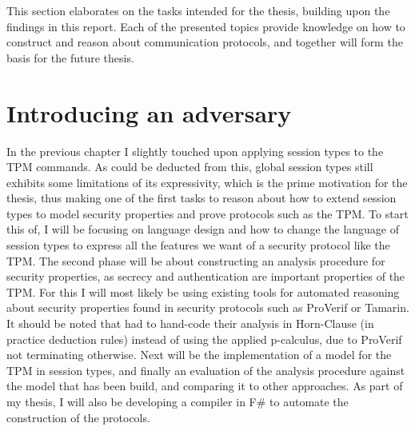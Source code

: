 \label{chap:Future Plan}
This section elaborates on the tasks intended for the thesis, building upon the findings in this report. Each of the presented topics provide knowledge on how to construct and reason about communication protocols, and together will form the basis for the future thesis. 

\section{Introducing an adversary}
In the previous chapter I slightly touched upon applying session types to the TPM commands. As could be deducted from this, global session types still exhibits some limitations of its expressivity, which is the prime motivation for the thesis, thus making one of the first tasks to reason about how to extend session types to model security properties and prove protocols such as the TPM. 
To start this of, I will be focusing on language design and how to change the language of session types to express all the features we want of a security protocol like the TPM. 
The second phase will be about constructing an analysis procedure for security properties, as secrecy and authentication are important properties of the TPM. For this I will most likely be using existing tools for automated reasoning about security properties found in security protocols such as ProVerif or Tamarin. It should be noted that \citeauthor{DBLP:conf/ifip1-7/ChenR09} had to hand-code their analysis in Horn-Clause (in practice deduction rules) instead of using the applied p-calculus, due to ProVerif not terminating otherwise.
Next will be the implementation of a model for the TPM in session types, and finally an evaluation of the analysis procedure against the model that has been build, and comparing it to other approaches. 
As part of my thesis, I will also be developing a compiler in F\# to automate the construction of the protocols.
\iffalse
For the future work section:
Since you?ve seen all these limitations, in the evaluation section, with session types to express security protocols, you would like to study a way to extend them to prove protocols like the TPM one correct.
The first phase should be language design: how to change the language of session types to express all the features we want of a security protocol like the TPM.
The second phase should be the construction of an analysis procedure for a security property (secrecy and authentication are important properties in the TPM), possibly using existing tools like ProVerif and Tamarin.
Next, the implementation of a model for the TPM in session types, possibly simplified if need be.
Finally, the evaluation of the analysis procedure against the model that we?ve built, and also in comparison to other approaches. 

Mention that the original paper on the TPM had to hand-code their analysis in Horn clauses (in practice deduction rules), instead of directly using the Applied Pi-calculus, because ProVerif would not terminate.
\fi